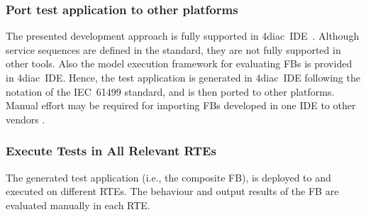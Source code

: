 \subsubsection{Port test application to other platforms}
The presented development approach is fully supported in 4diac~IDE~\cite{eclipse4diac}. Although service sequences are defined in the standard, they are not fully supported in other tools. Also the model execution framework for evaluating FBs is provided in 4diac~IDE. Hence, the test application is generated in 4diac~IDE following the notation of the IEC~61499 standard, and is then ported to other platforms. Manual effort may be required for importing FBs developed in one IDE to other vendors \cite{cheng_pang_portability}.

\subsubsection{Execute Tests in All Relevant RTEs}
The generated test application (i.e., the composite FB), is deployed to and executed on different RTEs. The behaviour and output results of the FB are evaluated manually in each RTE.



